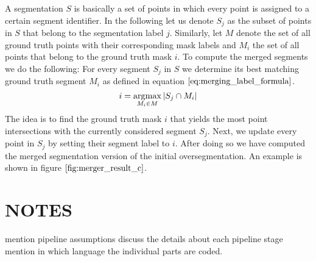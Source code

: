 A segmentation $S$ is basically a set of points in which every point is assigned to a certain segment identifier. In the following let us denote $S_j$ as the subset of points in $S$ that belong to the segmentation label $j$. Similarly, let $M$ denote the set of all ground truth points with their corresponding mask labels and $M_i$ the set of all points that belong to the ground truth mask $i$. To compute the merged segments we do the following: For every segment $S_j$ in $S$ we determine its best matching ground truth segment $M_i$ as defined in equation $\ref{eq:merging_label_formula}$. 
\begin{equation}
i = \operatorname*{\arg\!\max}\limits_{M_i \in M} \left\vert{S_j \cap M_i}\right\vert
\label{eq:merging_label_formula}
\end{equation}
The idea is to find the ground truth mask $i$ that yields the most point intersections with the currently considered segment $S_j$. Next, we update every point in $S_j$ by setting their segment label to $i$. After doing so we have computed the merged segmentation version of the initial oversegmentation. An example is shown in figure $\ref{fig:merger_result_c}$.

\section{NOTES}
mention pipeline assumptions
discuss the details about each pipeline stage
mention in which language the individual parts are coded.
